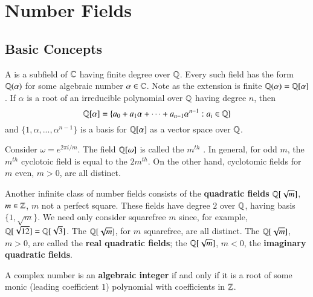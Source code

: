 %
%
%
\chapter{Number Fields}
\label{Numb} %




\section{Basic Concepts}
\label{sec:BC1}

A  is a subfield of $\mathbb C$ having finite degree over $\mathbb Q$. Every such field has the form $\mathbb Q(\alpha)$ for some algebraic number $\alpha \in \mathbb C$. Note as the extension is finite $\mathbb Q(\alpha) = \mathbb Q[\alpha]$. If $\alpha$ is a root of an irreducible polynomial over $\mathbb Q$ having degree $n$, then $$\mathbb Q[\alpha] = \{a_0+a_1\alpha+\cdots+a_{n-1}\alpha^{n-1}:a_i \in \mathbb Q\}$$
and $\{1,\alpha,...,\alpha^{n-1}\}$ is a basis for $\mathbb Q[\alpha]$ as a vector space over $\mathbb Q$.

Consider $\omega = e^{2\pi i/m}$. The field $\mathbb Q[\omega]$ is called the $m^{th}$ . In general, for odd $m$, the $m^{th}$ cyclotoic field is equal to the $2m^{th}$. On the other hand, cyclotomic fields for $m$ even, $m > 0$, are all distinct.

Another infinite class of number fields consists of the \textbf{quadratic fields} $\mathbb Q[\sqrt{m}]$, $m \in \mathbb Z$, $m$ not a perfect square. These fields have degree $2$ over $\mathbb Q$, having basis $\{1,\sqrt{m}\}$. We need only consider squarefree $m$ since, for example, $\mathbb Q[\sqrt{12}] = \mathbb Q[\sqrt{3}]$. The $\mathbb Q[\sqrt{m}]$, for $m$ squarefree, are all distinct. The $\mathbb Q[\sqrt{m}]$, $m > 0$, are called the \textbf{real quadratic fields}; the $\mathbb Q[\sqrt{m}]$, $m < 0$, the \textbf{imaginary quadratic fields}.

\begin{defn}
    A complex number is an \textbf{algebraic integer} if and only if it is a root of some monic (leading coefficient $1$) polynomial with coefficients in $\mathbb Z$.
\end{defn}


